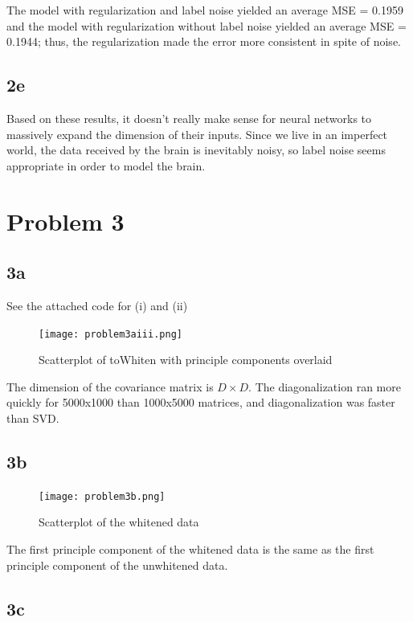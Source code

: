\documentclass[]{article}
\begin{document}
The model with regularization and label noise yielded an average MSE = 0.1959 and the model with regularization without label noise yielded an average MSE = 0.1944; thus, the regularization made the error more consistent in spite of noise.

\subsection*{2e}

Based on these results, it doesn't really make sense for neural networks to massively expand the dimension of their inputs. Since we live in an imperfect world, the data received by the brain is inevitably noisy, so label noise seems appropriate in order to model the brain.

\section*{Problem 3}

\subsection*{3a}

See the attached code for (i) and (ii)

\begin{figure}[H]
    \centering
    \texttt{[image: problem3aiii.png]}
    \caption{Scatterplot of toWhiten with principle components overlaid}
    \label{fig:my_label}
\end{figure}

The dimension of the covariance matrix is $D\times D$. The diagonalization ran more quickly for 5000x1000 than 1000x5000 matrices, and diagonalization was faster than SVD.

\subsection*{3b}

\begin{figure}[H]
    \centering
    \texttt{[image: problem3b.png]}
    \caption{Scatterplot of the whitened data}
    \label{fig:my_label}
\end{figure}

The first principle component of the whitened data is the same as the first principle component of the unwhitened data.

\subsection*{3c}
\end{document}
